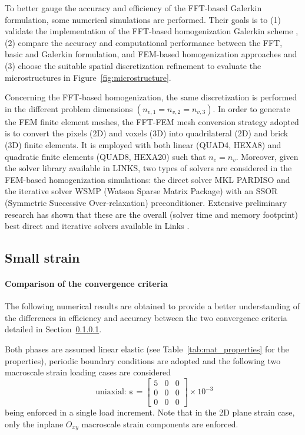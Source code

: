 To better gauge the accuracy and efficiency of the FFT-based Galerkin formulation, some numerical simulations are performed.
Their goals is to (1) validate the implementation of the FFT-based homogenization Galerkin scheme \citep{vondrejc_fft-based_2014, zeman_finite_2017, de_geus_finite_2017}, (2) compare the accuracy and computational performance between the FFT, basic \citep{moulinec_fast_1994} and Galerkin formulation, and FEM-based homogenization approaches and (3) choose the suitable spatial discretization refinement to evaluate the microstructures in Figure~\ref{fig:microstructure}.

Concerning the FFT-based homogenization, the same discretization is performed in the different problem dimensions \(\left(n_{v, 1}=n_{v, 2}=n_{v, 3}\right)\).
In order to generate the FEM finite element meshes, the FFT-FEM mesh conversion strategy adopted is to convert the pixels (2D) and voxels (3D) into quadrilateral (2D) and brick (3D) finite elements.
It is employed with both linear (QUAD4, HEXA8) and quadratic finite elements (QUAD8, HEXA20) such that \(n_{e}=n_{v}\).
Moreover, given the solver library available in LINKS, two types of solvers are considered in the FEM-based homogenization simulations: the direct solver MKL PARDISO \citep{schenk2001pardiso, schenk2004solving} and the iterative solver WSMP (Watson Sparse Matrix Package) \citep{gupta_improved_2002, gupta_wsmp_2002} with an SSOR (Symmetric Successive Over-relaxation) preconditioner.
Extensive preliminary research has shown that these are the overall (solver time and memory footprint) best direct and iterative solvers available in Links \citep{cardoso_coelho_election_2019}.

\subsection{Small strain}

\paragraph{Comparison of the convergence criteria}
The following numerical results are obtained to provide a better understanding of the differences in efficiency and accuracy between the two convergence criteria detailed in Section~\ref{}.

Both phases are assumed linear elastic (see Table~\ref{tab:mat_properties} for the properties), periodic boundary conditions are adopted and the following two macroscale strain loading cases are considered
\begin{equation}
\text { uniaxial: } \bm{\varepsilon}=\left[\begin{array}{lll}
5 & 0 & 0 \\
0 & 0 & 0 \\
0 & 0 & 0
\end{array}\right] \times 10^{-3}
\end{equation}
being enforced in a single load increment.
Note that in the 2D plane strain case, only the inplane \(O_{x y}\) macroscale strain components are enforced.



